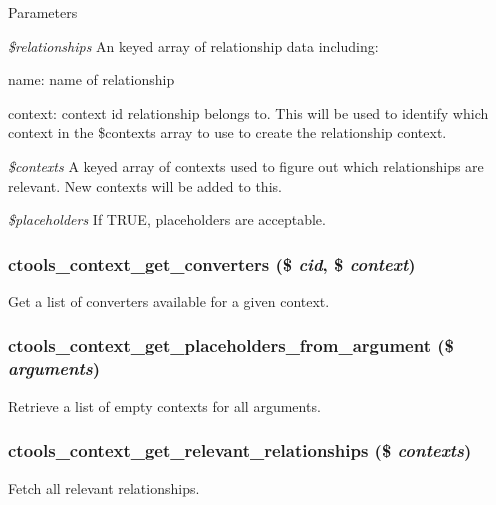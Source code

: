 \begin{DoxyParams}{Parameters}
\item[{\em \$relationships}]An keyed array of relationship data including:
\begin{DoxyItemize}
\item name: name of relationship
\item context: context id relationship belongs to. This will be used to identify which context in the \$contexts array to use to create the relationship context.
\end{DoxyItemize}\item[{\em \$contexts}]A keyed array of contexts used to figure out which relationships are relevant. New contexts will be added to this.\item[{\em \$placeholders}]If TRUE, placeholders are acceptable. \end{DoxyParams}
\hypertarget{context_8inc_a63b14b8dfdba384c89a1a91a8d518009}{
\subsubsection[{ctools\_\-context\_\-get\_\-converters}]{\setlength{\rightskip}{0pt plus 5cm}ctools\_\-context\_\-get\_\-converters (\$ {\em cid}, \/  \$ {\em context})}}
\label{context_8inc_a63b14b8dfdba384c89a1a91a8d518009}
Get a list of converters available for a given context. \hypertarget{context_8inc_a10a7b9e1be12405cb9de377762c7372b}{
\subsubsection[{ctools\_\-context\_\-get\_\-placeholders\_\-from\_\-argument}]{\setlength{\rightskip}{0pt plus 5cm}ctools\_\-context\_\-get\_\-placeholders\_\-from\_\-argument (\$ {\em arguments})}}
\label{context_8inc_a10a7b9e1be12405cb9de377762c7372b}
Retrieve a list of empty contexts for all arguments. \hypertarget{context_8inc_a3c4aa18332310a0d1d166a9f69bb80c7}{
\subsubsection[{ctools\_\-context\_\-get\_\-relevant\_\-relationships}]{\setlength{\rightskip}{0pt plus 5cm}ctools\_\-context\_\-get\_\-relevant\_\-relationships (\$ {\em contexts})}}
\label{context_8inc_a3c4aa18332310a0d1d166a9f69bb80c7}
Fetch all relevant relationships.

